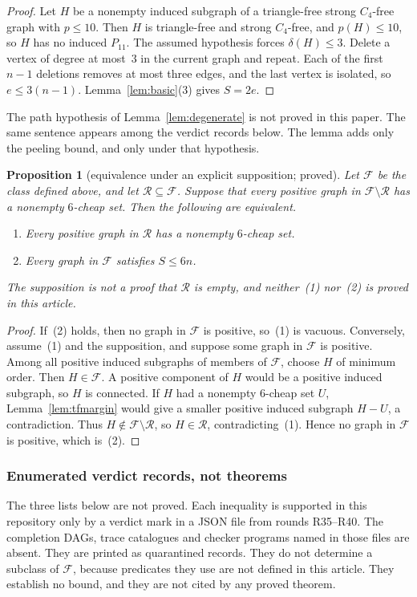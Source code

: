 \documentclass[11pt]{amsart}
\newtheorem{proposition}[theorem]{Proposition}
\theoremstyle{definition}
\theoremstyle{remark}
\newcommand{\pp}{p}
\begin{document}
\begin{proof}
Let $H$ be a nonempty induced subgraph of a triangle-free strong $C_4$-free graph with $\pp\le 10$. Then $H$ is triangle-free and strong $C_4$-free, and $\pp(H)\le 10$, so $H$ has no induced $P_{11}$. The assumed hypothesis forces $\delta(H)\le 3$. Delete a vertex of degree at most~$3$ in the current graph and repeat. Each of the first $n-1$ deletions removes at most three edges, and the last vertex is isolated, so $e\le 3(n-1)$. Lemma~\ref{lem:basic}(3) gives $S=2e$.
\end{proof}

The path hypothesis of Lemma~\ref{lem:degenerate} is not proved in this paper. The same sentence appears among the verdict records below. The lemma adds only the peeling bound, and only under that hypothesis.

\begin{proposition}[equivalence under an explicit supposition; proved]\label{prop:Gequiv}
Let $\mathcal F$ be the class defined above, and let $\mathcal R\subseteq\mathcal F$. Suppose that every positive graph in $\mathcal F\setminus\mathcal R$ has a nonempty $6$-cheap set. Then the following are equivalent.
\begin{enumerate}
\item Every positive graph in $\mathcal R$ has a nonempty $6$-cheap set.
\item Every graph in $\mathcal F$ satisfies $S\le 6n$.
\end{enumerate}
The supposition is not a proof that $\mathcal R$ is empty, and neither~\textup{(1)} nor~\textup{(2)} is proved in this article.
\end{proposition}

\begin{proof}
If~(2) holds, then no graph in $\mathcal F$ is positive, so~(1) is vacuous. Conversely, assume~(1) and the supposition, and suppose some graph in $\mathcal F$ is positive. Among all positive induced subgraphs of members of $\mathcal F$, choose $H$ of minimum order. Then $H\in\mathcal F$. A positive component of $H$ would be a positive induced subgraph, so $H$ is connected. If $H$ had a nonempty $6$-cheap set $U$, Lemma~\ref{lem:tfmargin} would give a smaller positive induced subgraph $H-U$, a contradiction. Thus $H\notin\mathcal F\setminus\mathcal R$, so $H\in\mathcal R$, contradicting~(1). Hence no graph in $\mathcal F$ is positive, which is~(2).
\end{proof}

\subsubsection*{Enumerated verdict records, not theorems}
The three lists below are not proved. Each inequality is supported in this repository only by a verdict mark in a JSON file from rounds R35--R40. The completion DAGs, trace catalogues and checker programs named in those files are absent. They are printed as quarantined records. They do not determine a subclass of $\mathcal F$, because predicates they use are not defined in this article. They establish no bound, and they are not cited by any proved theorem.
\end{document}
